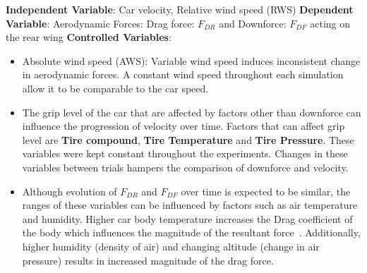 \documentclass[11pt, a4paper]{article}
\begin{document}
\textbf{Independent Variable}: Car velocity, Relative wind speed (RWS) \newline
\textbf{Dependent Variable}: Aerodynamic Forces: Drag force: $F_{DR}$ and Downforce: $F_{DF}$ acting on the rear wing  \newline
\textbf{Controlled Variables}: 
\begin{itemize}
    \item Absolute wind speed (AWS): Variable wind speed induces inconsistent change in aerodynamic forces. A constant wind speed throughout each simulation allow it to be comparable to the car speed.
    \item The grip level of the car that are affected by factors other than downforce can influence the progression of velocity over time. Factors that can affect grip level are \textbf{Tire compound}, \textbf{Tire Temperature} and \textbf{Tire Pressure}.
        These variables were kept constant throughout the experiments. Changes in these variables between trials hampers the comparison of downforce and velocity.
    \item Although evolution of $F_{DR}$ and $F_{DF}$ over time is expected to be similar, the ranges of these variables can be influenced by factors such as air temperature and humidity. 
        Higher car body temperature increases the Drag coefficient of the body which influences the magnitude of the resultant force~\cite{6}. Additionally, higher humidity (density of air) and changing altitude (change in air pressure) results in increased magnitude of the drag force. 
\end{itemize}
\end{document}
